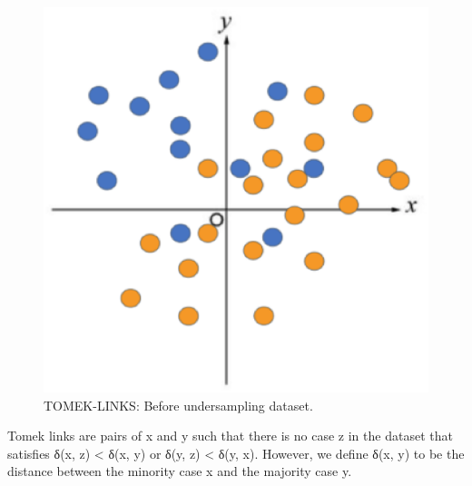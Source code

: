 \begin{center}
    \begin{figure}[ht]
        \caption{TOMEK-LINKS: Before undersampling dataset.}
        \label{tab:team-rating-features}
        \begin{center}
            \includegraphics[scale=0.6]{image/tomek1.eps}
        \end{center}
    \end{figure}
\end{center}

\clearpage

Tomek links are pairs of x and y such that there is no case z in the dataset that satisfies δ(x, z) < δ(x, y) or δ(y, z) < δ(y, x).
However, we define δ(x, y) to be the distance between the minority case x and the majority case y.

